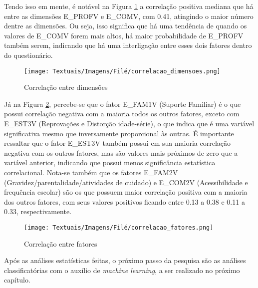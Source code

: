 Tendo isso em mente, é notável na Figura \ref{fig:matriz-correlacao-dimensoes} a correlação positiva mediana que há entre as dimensões E\_PROFV e E\_COMV, com 0.41, atingindo o maior número dentre as dimensões. Ou seja, isso significa que há uma tendência de quando os valores de E\_COMV forem mais altos, há maior probabilidade de E\_PROFV também serem, indicando que há uma interligação entre esses dois fatores dentro do questionário. 

\begin{figure}[ht!]
    \centering
    \caption{Correlação entre dimensões}
    \texttt{[image: Textuais/Imagens/Filé/correlacao\_dimensoes.png]}
    \label{fig:matriz-correlacao-dimensoes}
\end{figure}

Já na Figura \ref{fig:matriz-correlacao-fatores}, percebe-se que o fator E\_FAM1V (Suporte Familiar) é o que possui correlação negativa com a maioria todos os outros fatores, exceto com E\_EST3V (Reprovações e Distorção idade-série), o que indica que é uma variável significativa mesmo que inversamente proporcional às outras. É importante ressaltar que o fator E\_EST3V também possui em sua maioria correlação negativa com os outros fatores, mas são valores mais próximos de zero que a variável anterior, indicando que possui menos significância estatística correlacional. Nota-se também que os fatores E\_FAM2V (Gravidez/parentalidade/atividades de cuidado) e E\_COM2V (Acessibilidade e frequência escolar) são os que possuem maior correlação positiva com a maioria dos outros fatores, com seus valores positivos ficando entre 0.13 a 0.38 e 0.11 a 0.33, respectivamente.

\begin{figure}[ht!]
    \centering
    \caption{Correlação entre fatores}
    \texttt{[image: Textuais/Imagens/Filé/correlacao\_fatores.png]}
    \label{fig:matriz-correlacao-fatores}
\end{figure}

Após as análises estatísticas feitas, o próximo passo da pesquisa são as análises classificatórias com o auxílio de \textit{machine learning}, a ser realizado no próximo capítulo.



